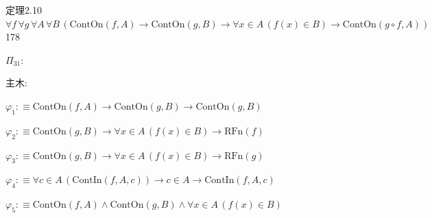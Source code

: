 \begin{fullproof}{定理2.10}{$\forall f\,\forall g\,\forall A\,\forall B\,(\mathrm{ContOn}(f,A) \to \mathrm{ContOn}(g,B) \to \forall x \in A\,(f(x) \in B) \to \mathrm{ContOn}(g \circ f,A))$}{178}
\begin{ptree}
\noLine
{}
\noLine
{}
\end{ptree}
\noindent$\Pi_{31}$:
\begin{ptree}
\noLine
{}
\end{ptree}
\noindent 主木:
\begin{ptree}
\noLine
{}
\noLine
{}
\noLine
{}
\end{ptree}
\begin{abbrevlist}
\item $\varphi_{1} :\equiv \mathrm{ContOn}(f,A) \to \mathrm{ContOn}(g,B) \to \mathrm{ContOn}(g,B)$
\item $\varphi_{2} :\equiv \mathrm{ContOn}(g,B) \to \forall x \in A\,(f(x) \in B) \to \mathrm{RFn}(f)$
\item $\varphi_{3} :\equiv \mathrm{ContOn}(g,B) \to \forall x \in A\,(f(x) \in B) \to \mathrm{RFn}(g)$
\item $\varphi_{4} :\equiv \forall c \in A\,(\mathrm{ContIn}(f,A,c)) \to c \in A \to \mathrm{ContIn}(f,A,c)$
\item $\varphi_{5} :\equiv \mathrm{ContOn}(f,A) \land \mathrm{ContOn}(g,B) \land \forall x \in A\,(f(x) \in B)$

\end{abbrevlist}
\end{fullproof}
